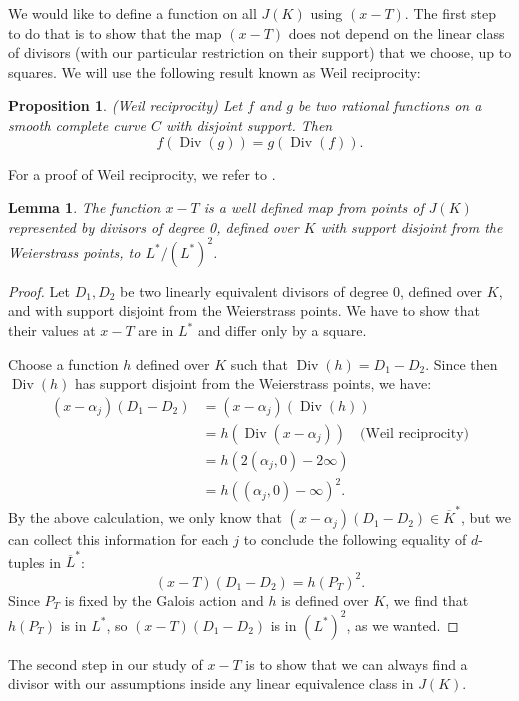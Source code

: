 \documentclass[a4paper, 12pt]{amsart}
\theoremstyle{definition}
\theoremstyle{plain}
\newtheorem{prop0}[defn0]{Proposition}
\theoremstyle{plain}
\theoremstyle{plain}
\newtheorem{lemma0}[defn0]{Lemma}
\theoremstyle{plain}
\theoremstyle{remark}
\theoremstyle{remark}
\theoremstyle{plain}
\newenvironment{proposition}{ \begin{prop0}}{\end{prop0}}
\newenvironment{lemma}{ \begin{lemma0}}{\end{lemma0}}
\DeclareMathOperator{\Div}{Div}
\begin{document}
	We would like to define a function on all $J(K)$ using $(x-T)$. The first step to do that is to show that the map $(x-T)$ does not depend on the linear class of divisors (with our particular restriction on their support) that we choose, up to squares. We will use the following result known as Weil reciprocity:
	\begin{proposition}(Weil reciprocity)
		Let $f$ and $g$ be two rational functions on a smooth complete curve $C$ with disjoint support. Then
		\begin{equation*}
			f(\Div(g))=g(\Div(f)).
		\end{equation*}
	\end{proposition}
	For a proof of Weil reciprocity, we refer to \cite{Arbarello_Cornalba_Griffiths_Harris_1985}.
	\begin{lemma}\label{x-Twelldefined}
		The function $x-T$ is a well defined map from points of $J(K)$ represented by divisors of degree 0, defined over $K$ with support disjoint from the Weierstrass points, to $L^*/(L^*)^2$.
	\end{lemma}
	\begin{proof}
		Let $D_1,D_2$ be two linearly equivalent divisors of degree 0, defined over $K$, and with support disjoint from the Weierstrass points. We have to show that their values at $x-T$ are in $L^*$ and differ only by a square.
		
		Choose a function $h$ defined over $K$ such that $\Div(h)=D_1-D_2$. Since then $\Div(h)$ has support disjoint from the Weierstrass points, we have:
		\begin{align*}
			(x-\alpha_j)(D_1-D_2)&=(x-\alpha_j)(\Div(h))\\
			&=h(\Div(x-\alpha_j))\quad\text{(Weil reciprocity)}\\
			&=h(2(\alpha_j,0)-2\infty)\\
			&=h((\alpha_j,0)-\infty)^2.
		\end{align*}
		By the above calculation, we only know that $(x-\alpha_j)(D_1-D_2)\in\overline{K}^*$, but we can collect this information for each $j$ to conclude the following equality of $d$-tuples in $\overline{L}^*$:
		\begin{equation*}
			(x-T)(D_1-D_2)=h(P_T)^2.
		\end{equation*}
		Since $P_T$ is fixed by the Galois action and $h$ is defined over $K$, we find that $h(P_T)$ is in $L^*$, so $(x-T)(D_1-D_2)$ is in $(L^*)^2$, as we wanted.
	\end{proof}
	The second step in our study of $x-T$ is to show that we can always find a divisor with our assumptions inside any linear equivalence class in $J(K)$.
\end{document}

